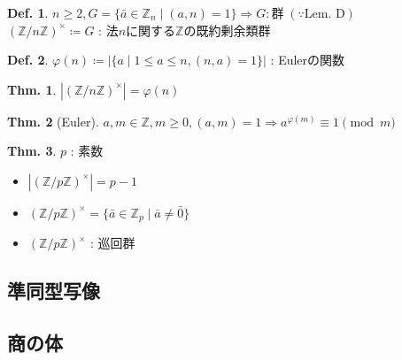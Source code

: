 \documentclass[uplatex,dvipdfmx,9pt]{beamer}
\newcommand{\sscount}{\textsection \thesubsection}
\newcounter{textExmCount}
\theoremstyle{definition} %
\newtheorem{defn}{Def.}[subsection] %
\newtheorem{thm}{Thm.}[subsection] %
\theoremstyle{example}
\begin{document}
    \begin{frame}
 
      \begin{defn}
        $n \ge 2, G = \{\bar{a} \in \mathbb{Z}_n \mid (a, n) = 1\} \Rightarrow G : \text{群} \; (\because \text{Lem. D})$ \\
        $(\mathbb{Z} / n\mathbb{Z})^\times \coloneqq G$ : 法$n$に関する$\mathbb{Z}$の\alert{既約剰余類群}
      \end{defn}

      \begin{defn}
        $\varphi(n) \coloneqq |\{a \mid 1 \le a \le n, (n, a) = 1\}|$ : \alert{Eulerの関数}
      \end{defn}

      \begin{thm}
        $|(\mathbb{Z} / n\mathbb{Z})^\times| = \varphi(n)$
      \end{thm}

      \begin{thm}[Euler]
        $a, m \in \mathbb{Z}, m \ge 0, (a, m) = 1 \Rightarrow a^{\varphi(m)} \equiv 1 \pmod{m}$
      \end{thm}

    \end{frame}

    \begin{frame}
 
      \begin{thm}
        $p$ : 素数
        \begin{itemize}
          \item $|(\mathbb{Z} / p\mathbb{Z})^\times| = p - 1$
          \item $(\mathbb{Z} / p\mathbb{Z})^\times = \{\bar{a} \in \mathbb{Z}_p \mid \bar{a} \neq \bar{0}\}$
          \item $(\mathbb{Z} / p\mathbb{Z})^\times$ : 巡回群
        \end{itemize}
      \end{thm}
      
    \end{frame}

    \subsection{\sscount 準同型写像}
    \setcounter{textExmCount}{0}

    \subsection{\sscount 商の体}
    \setcounter{textExmCount}{0}
\end{document}
